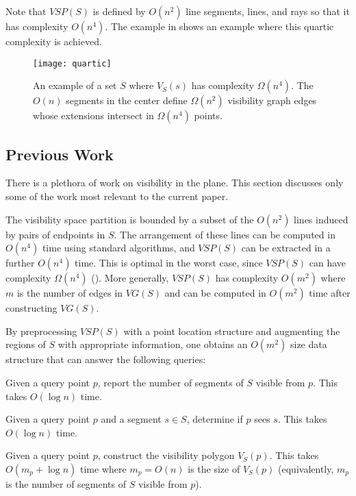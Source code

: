 \documentclass{patmorin}
\newcommand{\VG}{\mathit{VG}}
\newcommand{\VSP}{\mathit{VSP}}
\begin{document}
Note that $\VSP(S)$ is defined by $O(n^2)$ line segments, lines, and rays
so that it has complexity $O(n^4)$.  The example in  shows
an example where this quartic complexity is achieved.

\begin{figure}
  \begin{center}
    \texttt{[image: quartic]}
  \end{center}
  \caption{An example of a set $S$ where $V_S(s)$ has complexity
   $\Omega(n^4)$. The $O(n)$ segments in the center define $\Omega(n^2)$
   visibility graph edges whose extensions intersect in $\Omega(n^4)$ points.}
\end{figure}

\subsection{Previous Work}

There is a plethora of work on visibility in the plane.  This section
discusses only some of the work most relevant to the current paper.

The visibility space partition is bounded by a subset of the $O(n^2)$ lines
induced by pairs of endpoints in $S$. The arrangement of these lines can be
computed in $O(n^4)$ time using standard algorithms, and $\VSP(S)$ can be
extracted in a further $O(n^4)$ time.  This is optimal in the worst case,
since $\VSP(S)$ can have complexity $\Omega(n^4)$ \cite[Figure~8.13]{o87}
().  More generally, $\VSP(S)$ has complexity $O(m^2)$
where $m$ is the number of edges in $\VG(S)$ and can be computed in
$O(m^2)$ time after constructing $\VG(S)$.

By preprocessing $\VSP(S)$ with a point location structure and augmenting
the regions of $S$ with appropriate information, one obtains an $O(m^2)$
size data structure that can answer the following queries:

\begin{prb}
  Given a query point $p$, report the number of segments of $S$ visible
  from $p$.  This takes $O(\log n)$ time.
\end{prb}

\begin{prb}
  Given a query point $p$ and a segment $s\in S$, determine if $p$
  sees $s$.  This takes $O(\log n)$ time.
\end{prb}

\begin{prb}
  Given a query point $p$, construct the visibility polygon $V_S(p)$.
  This takes $O(m_p+\log n)$ time where $m_p=O(n)$ is the size of $V_S(p)$
  (equivalently, $m_p$ is the number of segments of $S$ visible from $p$).
\end{prb}
\end{document}
